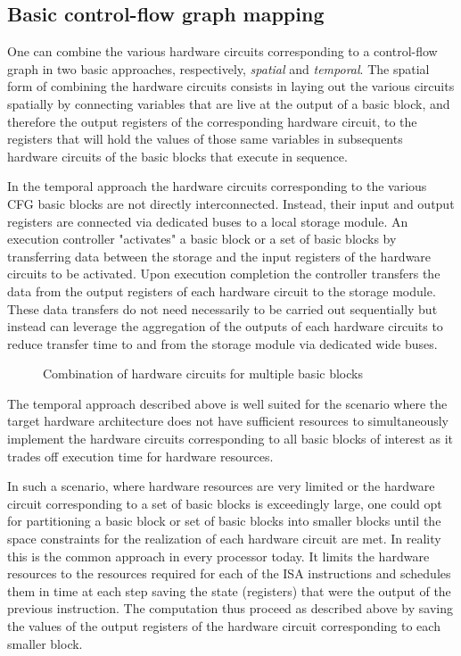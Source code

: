 \subsection{Basic control-flow graph mapping}
\label{sec:cfg_mapping}
One can combine the various hardware circuits corresponding to a control-flow graph in two basic approaches, respectively, {\em spatial} and {\em temporal}. 
The spatial form of combining the hardware circuits consists in laying out the various circuits spatially by connecting variables that are live at the output of a basic block, and therefore the output registers of the corresponding hardware circuit, to the registers that will hold the values of those same variables in subsequents hardware circuits of the basic blocks that execute in sequence.

In the temporal approach the hardware circuits corresponding to the various CFG basic blocks are not directly interconnected. 
Instead, their input and output registers are connected via dedicated buses to a local storage module. 
An execution controller "activates" a basic block or a set of basic blocks by transferring data between the storage and the input registers of the hardware circuits to be activated. 
Upon execution completion the controller transfers the data from the output registers of each hardware circuit to the storage module. 
These data transfers do not need necessarily to be carried out sequentially but instead can leverage the aggregation of the outputs of each hardware circuits to reduce transfer time to and from the storage module via dedicated wide buses.

\begin{figure}[htbp]
  \centering

\caption{Combination of hardware circuits for multiple basic blocks}
\label{fig:Fig.4.4}
\end{figure}

The temporal approach described above is well suited for the scenario where the target hardware architecture does not have sufficient resources to simultaneously implement the hardware circuits corresponding to all basic blocks of interest as it trades off execution time for hardware resources.

In such a scenario, where hardware resources are very limited or the hardware circuit corresponding to a set of basic blocks is exceedingly large, one could opt for partitioning a basic block or set of basic blocks into smaller blocks until the space constraints for the realization of each hardware circuit are met. 
In reality this is the common approach in every processor today. 
It limits the hardware resources to the resources required for each of the ISA instructions and schedules them in time at each step saving the state (registers) that were the output of the previous instruction. 
The computation thus proceed as described above by saving the values of the output registers of the hardware circuit corresponding to each smaller block.

